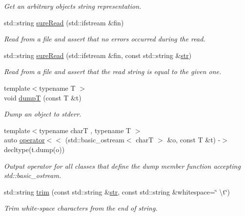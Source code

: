 \begin{DoxyCompactItemize}
\begin{DoxyCompactList}\small\item\em Get an arbitrary object\textquotesingle{}s string representation. \end{DoxyCompactList}\item 
std\+::string \hyperlink{namespaceslb_1_1core_1_1util_a390411b2bdd9cdf930071614c6712579}{sure\+Read} (std\+::ifstream \&fin)
\begin{DoxyCompactList}\small\item\em Read from a file and assert that no errors occurred during the read. \end{DoxyCompactList}\item 
std\+::string \hyperlink{namespaceslb_1_1core_1_1util_ae3ed6a8de55ec15aa85f72911546e20d}{sure\+Read} (std\+::ifstream \&fin, const std\+::string \&\hyperlink{namespaceslb_1_1core_1_1util_a2e7207fe123391c539ef9924d347f7e1}{str})
\begin{DoxyCompactList}\small\item\em Read from a file and assert that the read string is equal to the given one. \end{DoxyCompactList}\item 
{\footnotesize template$<$typename T $>$ }\\void \hyperlink{namespaceslb_1_1core_1_1util_a06aba127ff89c79f893cf9e1cb10ff79}{dumpT} (const T \&t)
\begin{DoxyCompactList}\small\item\em Dump an object to {\ttfamily stderr}. \end{DoxyCompactList}\item 
{\footnotesize template$<$typename charT , typename T $>$ }\\auto \hyperlink{namespaceslb_1_1core_1_1util_a719c889c611ba3d22441ad3d29243e1a}{operator$<$$<$} (std\+::basic\+\_\+ostream$<$ charT $>$ \&o, const T \&t) -\/$>$ decltype(t.\+dump(o))
\begin{DoxyCompactList}\small\item\em Output operator for all classes that define the dump member function accepting {\ttfamily std\+::basic\+\_\+ostream}. \end{DoxyCompactList}\item 
std\+::string \hyperlink{namespaceslb_1_1core_1_1util_a47a5d48f761811dede67fba654950c34}{trim} (const std\+::string \&\hyperlink{namespaceslb_1_1core_1_1util_a2e7207fe123391c539ef9924d347f7e1}{str}, const std\+::string \&whitespace=\char`\"{} \textbackslash{}t\char`\"{})
\begin{DoxyCompactList}\small\item\em Trim white-\/space characters from the end of string. \end{DoxyCompactList}\item 

\end{DoxyCompactItemize}
